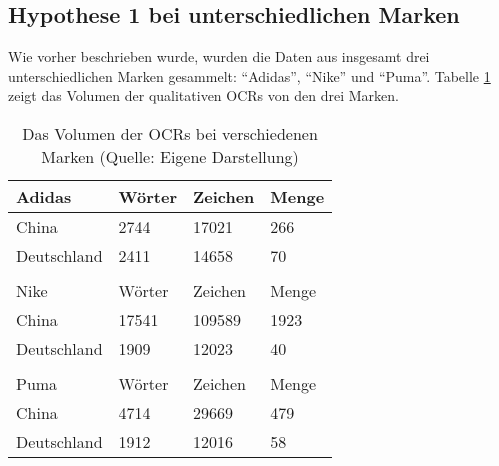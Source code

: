 \subsection{Hypothese 1 bei unterschiedlichen Marken}
Wie vorher beschrieben wurde, wurden die Daten aus insgesamt drei unterschiedlichen Marken gesammelt: ``Adidas'', ``Nike'' und ``Puma''. Tabelle \ref{tab:volumenMarken} zeigt das Volumen der qualitativen \ac{OCRs} von den drei Marken.
\begin{table}[htb]
\centering
\begin{tabular}{|llll|}
\hline
\multicolumn{1}{|l|}{Adidas}      & \multicolumn{1}{l|}{Wörter} & \multicolumn{1}{l|}{Zeichen} & Menge \\ \hline
\multicolumn{1}{|l|}{China}       & \multicolumn{1}{l|}{2744}   & \multicolumn{1}{l|}{17021}   & 266    \\ \hline
\multicolumn{1}{|l|}{Deutschland} & \multicolumn{1}{l|}{2411}   & \multicolumn{1}{l|}{14658}   & 70     \\ \hline
                                  &                             &                              &        \\ \hline
\multicolumn{1}{|l|}{Nike}        & \multicolumn{1}{l|}{Wörter} & \multicolumn{1}{l|}{Zeichen} & Menge \\ \hline
\multicolumn{1}{|l|}{China}       & \multicolumn{1}{l|}{17541}  & \multicolumn{1}{l|}{109589}  & 1923   \\ \hline
\multicolumn{1}{|l|}{Deutschland} & \multicolumn{1}{l|}{1909}   & \multicolumn{1}{l|}{12023}   & 40     \\ \hline
                                  &                             &                              &        \\ \hline
\multicolumn{1}{|l|}{Puma}        & \multicolumn{1}{l|}{Wörter} & \multicolumn{1}{l|}{Zeichen} & Menge \\ \hline
\multicolumn{1}{|l|}{China}       & \multicolumn{1}{l|}{4714}   & \multicolumn{1}{l|}{29669}   & 479    \\ \hline
\multicolumn{1}{|l|}{Deutschland} & \multicolumn{1}{l|}{1912}   & \multicolumn{1}{l|}{12016}   & 58     \\ \hline
\end{tabular}
\caption[Das Volumen der OCRs bei verschiedenen Marken]{Das Volumen der \ac{OCRs} bei verschiedenen Marken (Quelle: Eigene Darstellung)}
\label{tab:volumenMarken}
\end{table}

